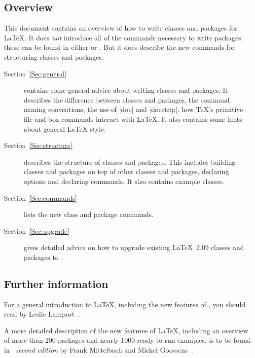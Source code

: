 \documentclass{ltxguide}[1995/11/28]
\begin{document}
\subsection{Overview}

This document contains an overview of how to write classes and
packages for \LaTeX{}.  It does \emph{not} introduce all of the
commands necessary to write packages: these can be found in either
\emph{\LaTeXbook} or \emph{\LaTeXcomp}.  But it does describe the new
commands for structuring classes and packages.

\begin{description}

\item[Section~\ref{Sec:general}] contains some general advice about
  writing classes and packages.  It describes the difference between
  classes and packages, the command naming conventions, the use of
  |doc| and |docstrip|, how \TeX's primitive file and box commands
  interact with \LaTeX{}. It also contains some hints about general
  \LaTeX{} style.

\item[Section~\ref{Sec:structure}] describes the structure of classes
  and packages.  This includes building classes and packages on top of
  other classes and packages, declaring options and declaring
  commands.  It also contains example classes.

\item[Section~\ref{Sec:commands}] lists the new class and package
   commands.

 \item[Section~\ref{Sec:upgrade}] gives detailed advice on how to
   upgrade existing \LaTeX~2.09 classes and packages to \LaTeXe{}.

\end{description}

\subsection{Further information}

For a general introduction to \LaTeX{}, including the new features of
\LaTeXe{}, you should read \emph{\LaTeXbook}
by Leslie Lamport~\cite{A-W:LLa94}.

A more detailed description of the new features of \LaTeX, including an
overview of more than 200 packages and nearly 1000 ready to run examples, is
to be found in \emph{\LaTeXcomp\ second edition} by Frank Mittelbach and
Michel Goossens~\cite{A-W:MG2004}.
\end{document}
